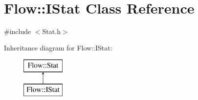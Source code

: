 \hypertarget{class_flow_1_1_i_stat}{}\section{Flow\+:\+:I\+Stat Class Reference}
\label{class_flow_1_1_i_stat}


{\ttfamily \#include $<$Stat.\+h$>$}

Inheritance diagram for Flow\+:\+:I\+Stat\+:\begin{figure}[H]
\begin{center}
\leavevmode
\includegraphics[height=2.000000cm]{class_flow_1_1_i_stat}
\end{center}
\end{figure}
